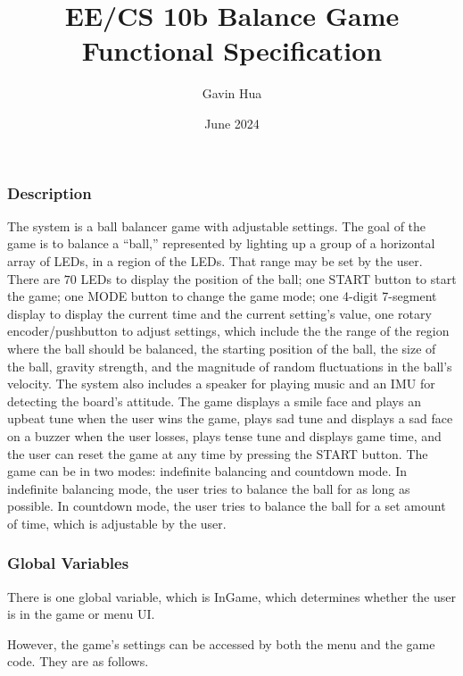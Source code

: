\documentclass[12pt]{article}
\title{EE/CS 10b Balance Game Functional Specification}
\author{Gavin Hua}
\date{June 2024}
\begin{document}
\maketitle

\subsubsection*{Description}
The system is a ball balancer game with adjustable settings. The goal of the 
game is to balance a ``ball,'' represented by lighting up a group of a 
horizontal array of LEDs, in a region of the LEDs. That range may be set by the
user. There are $70$ LEDs to display the position of the ball; one START button
to start the game; one MODE button to change the game mode; one 4-digit 
7-segment display to display the current time and the current setting's value,
one rotary encoder/pushbutton to adjust settings, which include the the range of
the region where the ball should be balanced, the starting position of the ball,
the size of the ball, gravity strength, and the magnitude of random fluctuations
in the ball's velocity. The system also includes a speaker for playing music and
an IMU for detecting the board's attitude. The game displays a smile face and plays an upbeat tune
when the user wins the game, plays sad tune and displays a sad face on a buzzer
when the user losses, plays tense tune and displays game time, and the user can reset the game at any time by pressing
the START button. The game can be in two modes: indefinite balancing and
countdown mode. In indefinite balancing mode, the user tries to balance the ball
for as long as possible. In countdown mode, the user tries to balance the ball
for a set amount of time, which is adjustable by the user.

\subsubsection*{Global Variables}
There is one global variable, which is InGame, which determines whether the user
is in the game or menu UI.

However, the game's settings can be accessed by both the menu and the game code.
They are as follows.
\end{document}
